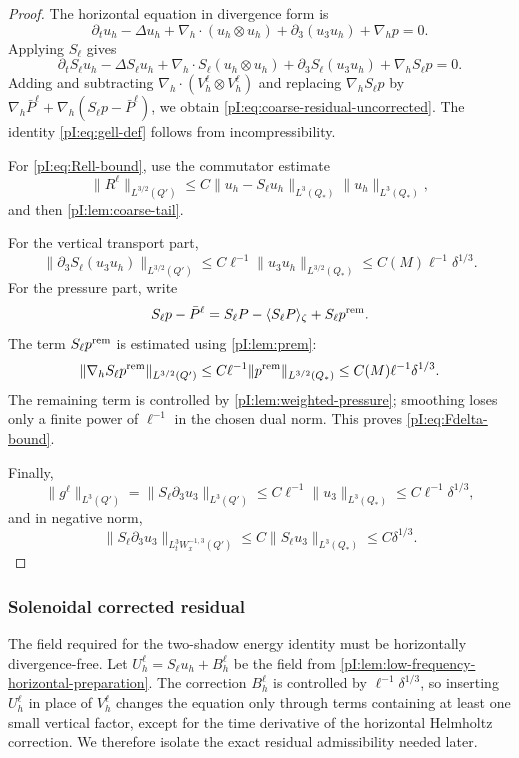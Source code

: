 \documentclass[11pt]{article}
\numberwithin{equation}{section}
\theoremstyle{plain}
\theoremstyle{definition}
\theoremstyle{remark}
\newcommand{\nabh}{\nabla_h}
\newcommand{\divh}{\nabla_h\!\cdot}
\begin{document}
\begin{proof}
The horizontal equation in divergence form is
\[
        \partial_tu_h-\Delta u_h
        +\divh(u_h\otimes u_h)+\partial_3(u_3u_h)+\nabh p=0.
\]
Applying \(S_\ell\) gives
\[
        \partial_tS_\ell u_h-\Delta S_\ell u_h
        +\divh S_\ell(u_h\otimes u_h)+\partial_3S_\ell(u_3u_h)+\nabh S_\ell p=0.
\]
Adding and subtracting \(\divh(V_h^\ell\otimes V_h^\ell)\) and replacing \(\nabh S_\ell p\) by \(\nabh\bar P^\ell+\nabh(S_\ell p-\bar P^\ell)\), we obtain \eqref{pI:eq:coarse-residual-uncorrected}.  The identity \eqref{pI:eq:gell-def} follows from incompressibility.

For \eqref{pI:eq:Rell-bound}, use the commutator estimate
\[
        \|R^\ell\|_{L^{3/2}(Q')}
        \le C\|u_h-S_\ell u_h\|_{L^3(Q_*)}\|u_h\|_{L^3(Q_*)},
\]
and then \cref{pI:lem:coarse-tail}.

For the vertical transport part,
\[
        \|\partial_3S_\ell(u_3u_h)\|_{L^{3/2}(Q')}
        \le C\ell^{-1}\|u_3u_h\|_{L^{3/2}(Q_*)}
        \le C(M)\ell^{-1}\delta^{1/3}.
\]
For the pressure part, write
\[
        S_\ell p-\bar P^\ell
        =S_\ell P-\langle S_\ell P\rangle_\zeta+S_\ell p^{\rm rem}.
\]
The term \(S_\ell p^{\rm rem}\) is estimated using \cref{pI:lem:prem}:
\[
        \|\nabh S_\ell p^{\rm rem}\|_{L^{3/2}(Q')}
        \le C\ell^{-1}\|p^{\rm rem}\|_{L^{3/2}(Q_*)}
        \le C(M)\ell^{-1}\delta^{1/3}.
\]
The remaining term is controlled by \cref{pI:lem:weighted-pressure}; smoothing loses only a finite power of \(\ell^{-1}\) in the chosen dual norm.  This proves \eqref{pI:eq:Fdelta-bound}.

Finally,
\[
        \|g^\ell\|_{L^3(Q')}
        =\|S_\ell\partial_3u_3\|_{L^3(Q')}
        \le C\ell^{-1}\|u_3\|_{L^3(Q_*)}
        \le C\ell^{-1}\delta^{1/3},
\]
and in negative norm,
\[
        \|S_\ell\partial_3u_3\|_{L^3_tW^{-1,3}_x(Q')}
        \le C\|S_\ell u_3\|_{L^3(Q_*)}
        \le C\delta^{1/3}.
\]
\end{proof}

\subsubsection{Solenoidal corrected residual}

The field required for the two-shadow energy identity must be horizontally divergence-free.  Let \(U_h^\ell=S_\ell u_h+B_h^\ell\) be the field from \cref{pI:lem:low-frequency-horizontal-preparation}.  The correction \(B_h^\ell\) is controlled by \(\ell^{-1}\delta^{1/3}\), so inserting \(U_h^\ell\) in place of \(V_h^\ell\) changes the equation only through terms containing at least one small vertical factor, except for the time derivative of the horizontal Helmholtz correction.  We therefore isolate the exact residual admissibility needed later.
\end{document}
